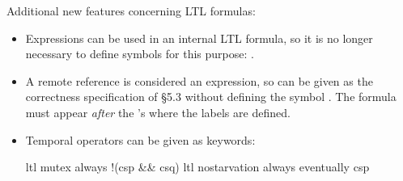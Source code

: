 \documentclass[11pt]{article}
\begin{document}
Additional new features concerning LTL formulas:
\begin{itemize}
\item Expressions can be used in an internal LTL formula, so it is no
longer necessary to define symbols for this purpose:
.
\item A remote reference is considered an expression, so
 can be given 
as the correctness specification of \S{}5.3 without defining the symbol
. The formula must appear \emph{after} the
's where the labels are defined.
\item 
Temporal operators can be given as keywords:
\begin{frag}
ltl mutex { always !(csp && csq) }
ltl nostarvation { always eventually csp }
\end{frag}
\end{itemize}
\end{document}
